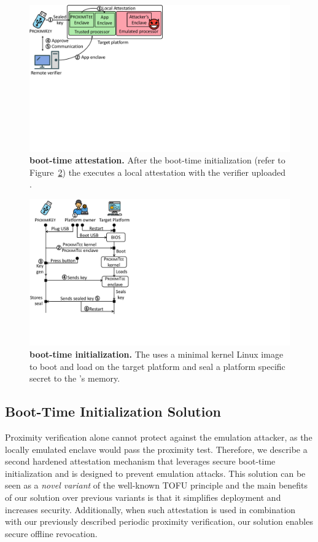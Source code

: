 \begin{figure}[t]
 \centering
\includegraphics[trim={0 9cm 16.5cm 0},clip,width=0.72\linewidth]{chapters/ProximiTEE/images_new/boot_attest.pdf}
 \caption[\name boot-time attestation]{\textbf{\name boot-time attestation.} After the boot-time initialization (refer to Figure~\ref{fig:boot-init}) the \nameclave executes a local attestation with the verifier uploaded \app. 
 }
 \label{fig:boot-attest}
\end{figure}


\begin{figure}[t]
 \centering
    \includegraphics[trim={0 2cm 19cm 0},clip,width=0.7\linewidth]{chapters/ProximiTEE/images_new/boot_init.pdf}
 \caption[\name noot-time initialization]{\textbf{\name boot-time initialization.} The \device uses a minimal kernel Linux image to boot and load \nameclave on the target platform and seal a platform specific secret to the \device{}'s memory.}
 \label{fig:boot-init}
\end{figure}



\subsection{Boot-Time Initialization Solution}

Proximity verification alone cannot protect against the emulation attacker, as the locally emulated enclave would pass the proximity test. 
%
Therefore, we describe a second hardened attestation mechanism that leverages secure boot-time initialization and is designed to prevent emulation attacks. This solution can be seen as a \emph{novel variant} of the well-known TOFU principle and the main benefits of our solution over previous variants is that it simplifies deployment and increases security. Additionally, when such attestation is used in combination with our previously described periodic proximity verification, our solution enables secure offline revocation.


